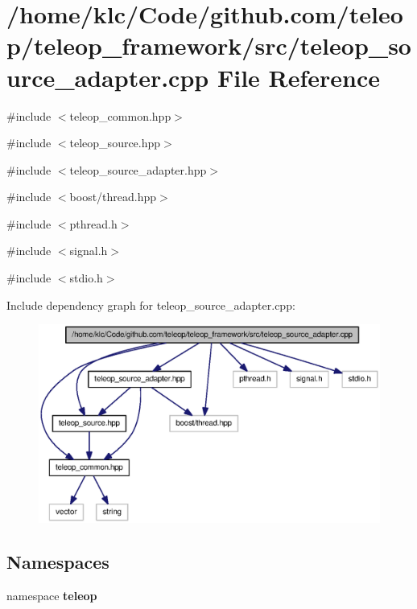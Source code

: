 \section{/home/klc/Code/github.com/teleop/teleop\_\-framework/src/teleop\_\-source\_\-adapter.cpp File Reference}
\label{teleop__source__adapter_8cpp}
{\ttfamily \#include $<$teleop\_\-common.hpp$>$}\par
{\ttfamily \#include $<$teleop\_\-source.hpp$>$}\par
{\ttfamily \#include $<$teleop\_\-source\_\-adapter.hpp$>$}\par
{\ttfamily \#include $<$boost/thread.hpp$>$}\par
{\ttfamily \#include $<$pthread.h$>$}\par
{\ttfamily \#include $<$signal.h$>$}\par
{\ttfamily \#include $<$stdio.h$>$}\par
Include dependency graph for teleop\_\-source\_\-adapter.cpp:
\nopagebreak
\begin{figure}[H]
\begin{center}
\leavevmode
\includegraphics[width=400pt]{teleop__source__adapter_8cpp__incl}
\end{center}
\end{figure}
\subsection*{Namespaces}
\begin{DoxyCompactItemize}
\item 
namespace {\bf teleop}
\end{DoxyCompactItemize}
